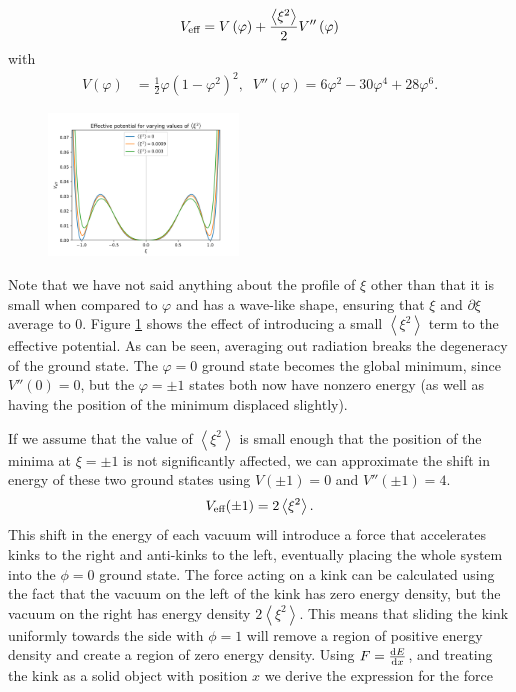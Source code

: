 \documentclass[11pt, oneside,titlepage]{article}  	%
\numberwithin{equation}{section}
\newcommand{\drv}{\ensuremath{\textup{d}}}
\begin{document}
\begin{equation}
V_\textup{eff} = V\left ( \varphi \right ) + \frac{\left \langle \xi^2 \right \rangle}{2}V''\left ( \varphi \right ) 
\end{equation}
with
\begin{align}
V(\varphi) &= \frac{1}{2} \varphi \left ( 1- \varphi^2 \right )^2, \; \;V''(\varphi) = 6\varphi^2 - 30\varphi^4 + 28\varphi^6.
\end{align}
\begin{figure}
\centering
 \includegraphics[width=0.45\textwidth]{potential_averaged.png}
  \label{potential_averaged}
\end{figure}
Note that we have not said anything about the profile of $\xi$ other than that it is small when compared to $\varphi$ and has a wave-like shape, ensuring that $\xi$ and $\partial \xi$ average to 0. Figure \ref{potential_averaged} shows the effect of introducing a small $\left \langle \xi^2 \right \rangle$ term to the effective potential. As can be seen, averaging out radiation breaks the degeneracy of the ground state. The $\varphi = 0$ ground state becomes the global minimum, since $V''(0) = 0$, but the $\varphi = \pm1$ states both now have nonzero energy (as well as having the position of the minimum displaced slightly).\par
If we assume that the value of $\left \langle \xi^2 \right \rangle$ is small enough that the position of the minima at $\xi = \pm 1$ is not significantly affected, we can approximate the shift in energy of these two ground states using $V(\pm1) = 0$ and $V''(\pm 1) = 4 $.
\begin{equation}
V_{\textup{eff}}(\pm1) = 2 \left \langle \xi^2 \right \rangle.
\end{equation}
This shift in the energy of each vacuum will introduce a force that accelerates kinks to the right and anti-kinks to the left, eventually placing the whole system into the $\phi = 0$ ground state. The force acting on a kink can be calculated using the fact that the vacuum on the left of the kink has zero energy density, but the vacuum on the right has energy density $2 \left \langle \xi^2 \right \rangle$. This means that sliding the kink uniformly towards the side with $\phi = 1$ will remove a region of positive energy density and create a region of zero energy density. Using $F = \frac{\drv E}{\drv x}$, and treating the kink as a solid object with position $x$ we derive the expression for the force
\end{document}
